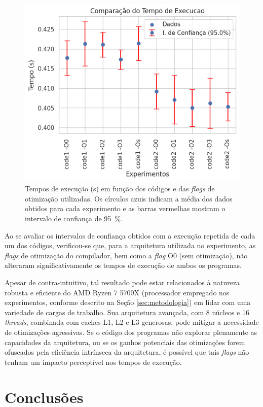 \documentclass[12pt,a4paper]{article}
\begin{document}
\begin{figure}[H]
\centering
\includegraphics[width=0.80\linewidth]{Figures/comparacao_execucao_codigo_intervalo.png}
\caption{Tempos de execução (\si{\second}) em função dos códigos e das \textit{flags} de otimização utilizadas. Os círculos azuis indicam a média dos dados obtidos para cada experimento e as barras vermelhas mostram o intervalo de confiança de \SI{95}{\percent}.}
\label{fig:tempo_execucao}
\end{figure}

Ao se avaliar os intervalos de confiança obtidos com a execução repetida de cada um dos códigos, verificou-se que, para a arquitetura utilizada no experimento, as \textit{flags} de otimização do compilador, bem como a \textit{flag} O0 (sem otimização), não alteraram significativamente os tempos de execução de ambos os programas. 

Apesar de contra-intuitivo, tal resultado pode estar relacionados à natureza robusta e eficiente do AMD Ryzen 7 5700X (processador empregado nos experimentos, conforme descrito na Seção \ref{sec:metodologia}) em lidar com uma variedade de cargas de trabalho. Sua arquitetura avançada, com 8 núcleos e 16 \textit{threads}, combinada com caches L1, L2 e L3 generosas, pode mitigar a necessidade de otimizações agressivas. Se o código dos programas não explorar plenamente as capacidades da arquitetura, ou se os ganhos potenciais das otimizações forem ofuscados pela eficiência intrínseca da arquitetura, é possível que tais \textit{flags} não tenham um impacto perceptível nos tempos de execução.

\section{Conclusões}
\end{document}
